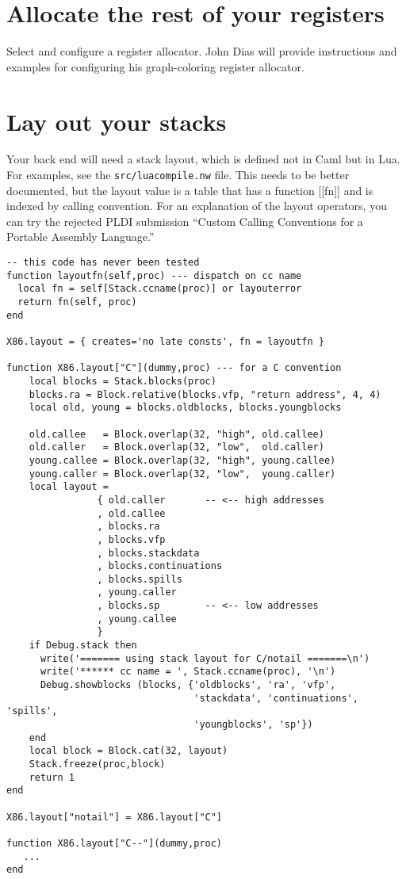 \documentclass[12pt]{article}
\begin{document}
\section{Allocate the rest of your registers}

Select and configure a register allocator.
John Dias will provide instructions and examples for configuring his
graph-coloring register allocator.

\section{Lay out your stacks}

Your back end will need a stack layout, which is defined not in Caml
but in Lua.
For examples, see the \texttt{src/luacompile.nw} file.
This needs to be better documented, but the layout value is a table
that has a function [[fn]] and is indexed by calling convention.
For an explanation of the layout operators, you can
try the rejected PLDI submission ``Custom Calling Conventions for a
Portable Assembly Language.''
\begin{verbatim}
-- this code has never been tested
function layoutfn(self,proc) --- dispatch on cc name
  local fn = self[Stack.ccname(proc)] or layouterror
  return fn(self, proc)
end

X86.layout = { creates='no late consts', fn = layoutfn }

function X86.layout["C"](dummy,proc) --- for a C convention 
    local blocks = Stack.blocks(proc)
    blocks.ra = Block.relative(blocks.vfp, "return address", 4, 4)
    local old, young = blocks.oldblocks, blocks.youngblocks

    old.callee   = Block.overlap(32, "high", old.callee)
    old.caller   = Block.overlap(32, "low",  old.caller)
    young.callee = Block.overlap(32, "high", young.callee)
    young.caller = Block.overlap(32, "low",  young.caller)
    local layout = 
                { old.caller       -- <-- high addresses
                , old.callee
                , blocks.ra
                , blocks.vfp
                , blocks.stackdata
                , blocks.continuations
                , blocks.spills
                , young.caller
                , blocks.sp        -- <-- low addresses 
                , young.callee
                }
    if Debug.stack then
      write('======= using stack layout for C/notail =======\n')
      write('****** cc name = ', Stack.ccname(proc), '\n')
      Debug.showblocks (blocks, {'oldblocks', 'ra', 'vfp',
                                 'stackdata', 'continuations', 'spills',
                                 'youngblocks', 'sp'})
    end
    local block = Block.cat(32, layout)
    Stack.freeze(proc,block)
    return 1
end    

X86.layout["notail"] = X86.layout["C"]

function X86.layout["C--"](dummy,proc)
   ...
end    
\end{verbatim}
\end{document}
